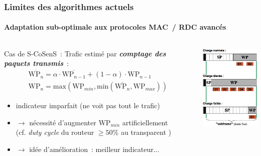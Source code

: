 \documentclass[10pt,c]{beamer}
\newcommand{\lang}[1]{\textit{#1}}
\renewcommand{\emph}[1]{\textbf{\textit{#1}}}
\begin{document}
\begin{frame}[label=limitesAlgoSCoSenS1]
\frametitle{Limites des algorithmes actuels}
\framesubtitle{Adaptation sub-optimale aux protocoles MAC~/ RDC avancés}

\begin{columns}[c]

\begin{column}{8cm}

\vspace{-0.25cm}
\begin{block}{Cas de S-CoSenS~:}
Trafic estimé par \emph{comptage des paquets transmis}~:\\
\[
\begin{array}{l}
\overline{\mathrm{WP}_n} = \alpha \cdot \overline{\mathrm{WP}_{n - 1}}
                          + (1 - \alpha) \cdot \mathrm{WP}_{n - 1} \\
\mathrm{WP}_n = \mathrm{max}(\mathrm{WP}_{min},
                              \mathrm{min}(\overline{\mathrm{WP}_n},
                                           \mathrm{WP}_{max}))
\end{array}
\]
\begin{itemize}
\item indicateur imparfait (ne voit pas tout le trafic)
\item $\rightarrow$ nécessité d'augmenter $\mathrm{WP}_{min}$
      artificiellement \\
       {\small (cf. \lang{duty cycle} du routeur $\geq 50\%$
                au transparent \pageref{comparContikiMAC4})}
\item $\rightarrow$ idée d'amélioration~: meilleur indicateur...
\end{itemize}
\end{block}

\end{column}

\begin{column}{3.5cm}

\includegraphics[width=3.5cm]{images/s-cosens-subframe.png}

\end{column}

\end{columns}

\end{frame}
\end{document}
